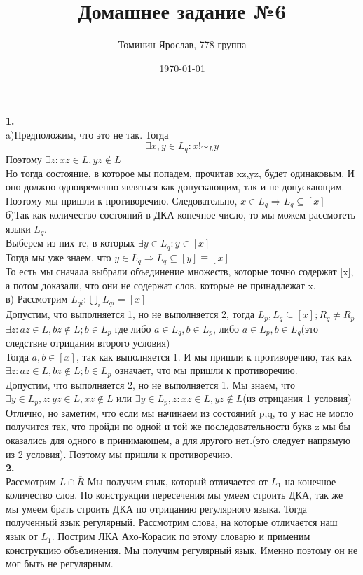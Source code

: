 \documentclass[a4paper,12pt]{article}
\author{Томинин Ярослав, 778 группа}
\title{Домашнее задание №6}
\date{\today}
\begin{document}
 

\maketitle
\newpage
\textbf{1.}\\
a)Предположим, что это не так. Тогда 
\[\exists x,y \in L_q : x  !\sim_L y\] 
Поэтому $\exists z: xz \in L , yz \notin L$\\
Но тогда состояние, в которое мы попадем, прочитав xz,yz, будет одинаковым. И оно должно одновременно являться как допускающим, так и не допускающим. Поэтому мы пришли к противоречию. Следовательно, $x \in L_q \Rightarrow L_q \subseteq [x]$ \\
б)Так как количество состояний в ДКА конечное число, то мы можем рассмотеть языки $L_q$. \\
Выберем из них те, в которых $\exists y \in L_q : y \in [x]$\\
Тогда мы уже знаем, что $y \in L_q \Rightarrow L_q \subseteq [y] \equiv [x]$\\
То есть мы сначала выбрали объединение множеств, которые точно содержат [x], а потом доказали, что они не содержат слов, которые не принадлежат x.\\
в) Рассмотрим $L_{qi}:\bigcup_{i} L_{qi}=[x]$\\
Допустим, что выполняется 1, но не выполняется 2, тогда $L_p,L_q \subseteq [x]; R_q \neq R_p$\\
$\exists z: az \in L, bz \notin L; b \in L_p$ где либо $a \in L_q, b \in L_p$, либо $a \in L_p, b \in L_q$(это следствие отрицания второго условия)\\
Тогда $a,b \in [x]$, так как выполняется 1. И мы пришли к противоречию, так как $\exists z: az \in L, bz \notin L; b \in L_p$ означает, что мы пришли к противоречию.\\
Допустим, что выполняется 2, но не выполняется 1.  Мы знаем, что $\exists y \in L_p, z : yz \in L, xz \notin L$ или $\exists  y \in L_p, z : xz \in L, yz \notin L$(из отрицания 1 условия)\\
Отлично, но заметим, что если мы начинаем из состояний p,q, то у нас не могло получится так, что пройди по одной и той же последовательности букв z мы бы оказались для одного в принимающем, а для лругого нет.(это следует напрямую из 2 условия). Поэтому мы пришли к противоречию.\\
\textbf{2.}\\
Рассмотрим $L \cap \overline{R}$ Мы получим язык, который отличается от $L_1$ на конечное количество слов. По конструкции пересечения мы умеем строить ДКА, так же мы умеем брать строить ДКА по отрицанию регулярного языка. Тогда полученный язык регулярный. Рассмотрим слова, на которые отличается наш язык от $L_1$.  Пострим ЛКА Ахо-Корасик по этому словарю и применим конструкцию объелинения. Мы получим регулярный язык. Именно поэтому он не мог быть не регулярным.\\
\end{document}
